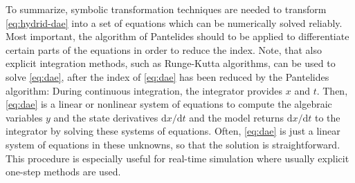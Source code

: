 To summarize, symbolic transformation techniques are needed to transform
\eqref{eq:hydrid-dae} into a set of equations which can be numerically solved reliably. Most
important, the algorithm of Pantelides should to be applied to
differentiate certain parts of the equations in order to reduce the
index. Note, that also explicit integration methods, such as Runge-Kutta
algorithms, can be used to solve \eqref{eq:dae}, after the index of \eqref{eq:dae} has been
reduced by the Pantelides algorithm: During continuous integration, the
integrator provides $x$ and $t$. Then, \eqref{eq:dae} is a linear or nonlinear system
of equations to compute the algebraic variables $y$ and the state
derivatives $\mathrm{d}x/\mathrm{d}t$ and the model returns $\mathrm{d}x/\mathrm{d}t$ to the integrator by
solving these systems of equations. Often, \eqref{eq:dae} is just a linear system
of equations in these unknowns, so that the solution is straightforward.
This procedure is especially useful for real-time simulation where
usually explicit one-step methods are used.
